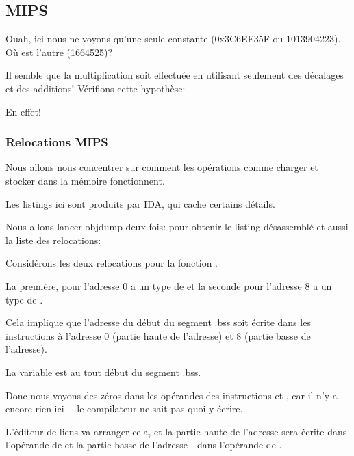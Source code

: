 \subsection{MIPS}



Ouah, ici nous ne voyons qu'une seule constante (0x3C6EF35F ou 1013904223).
Où est l'autre (1664525)?

Il semble que la multiplication soit effectuée en utilisant seulement des décalages
et des additions!
Vérifions cette hypothèse:





En effet!

\subsubsection{Relocations MIPS}

Nous allons nous concentrer sur comment les opérations comme charger et stocker dans
la mémoire fonctionnent.

Les listings ici sont produits par IDA, qui cache certains détails.

Nous allons lancer objdump deux fois: pour obtenir le listing désassemblé et aussi
la liste des relocations:



Considérons les deux relocations pour la fonction .

La première, pour l'adresse 0 a un type de  et la seconde pour
l'adresse 8 a un type de .

Cela implique que l'adresse du début du segment .bss soit écrite dans les instructions
à l'adresse 0 (partie haute de l'adresse) et 8 (partie basse de l'adresse).

La variable  est au tout début du segment .bss.

Donc nous voyons des zéros dans les opérandes des instructions \LUI et \SW, car il
n'y a encore rien ici--- le compilateur ne sait pas quoi y écrire.

L'éditeur de liens va arranger cela, et la partie haute de l'adresse sera écrite
dans l'opérande de \LUI et la partie basse de l'adresse---dans l'opérande de \SW.

